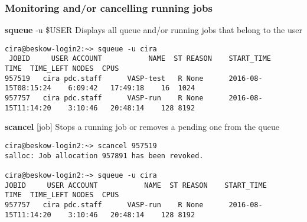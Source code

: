 \begin{frame}[fragile]
\frametitle{Monitoring and/or cancelling running jobs }
\begin{alertblock}{\textbf{squeue} -u  \$USER}
  Displays all queue and/or running jobs that belong to the user
\tiny
  \begin{verbatim}
cira@beskow-login2:~> squeue -u cira
 JOBID     USER ACCOUNT           NAME  ST REASON    START_TIME                TIME  TIME_LEFT NODES  CPUS
957519   cira pdc.staff      VASP-test   R None      2016-08-15T08:15:24    6:09:42   17:49:18    16  1024
957757   cira pdc.staff      VASP-run    R None      2016-08-15T11:14:20    3:10:46   20:48:14    128 8192
  \end{verbatim}
\end{alertblock}

\begin{alertblock}{\textbf{scancel} [job]}
Stops a running job or removes a pending one from the queue
\tiny
  \begin{verbatim}
cira@beskow-login2:~> scancel 957519
salloc: Job allocation 957891 has been revoked.

cira@beskow-login2:~> squeue -u cira
JOBID     USER ACCOUNT           NAME  ST REASON    START_TIME                TIME  TIME_LEFT NODES  CPUS
957757   cira pdc.staff      VASP-run    R None      2016-08-15T11:14:20    3:10:46   20:48:14    128 8192
  \end{verbatim}
\end{alertblock}
\end{frame}
